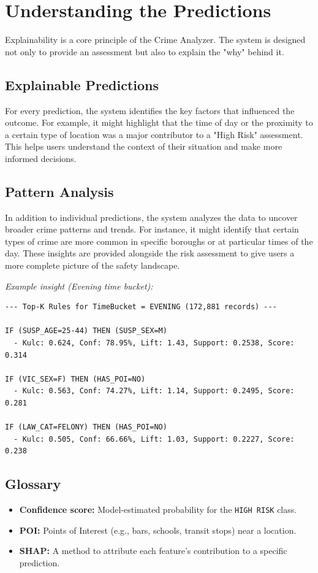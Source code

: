 \documentclass[11pt]{article}
\begin{document}
\section{Understanding the Predictions}
Explainability is a core principle of the Crime Analyzer. The system is designed not only to provide an assessment but also to explain the "why" behind it.

\subsection{Explainable Predictions}
For every prediction, the system identifies the key factors that influenced the outcome. For example, it might highlight that the time of day or the proximity to a certain type of location was a major contributor to a "High Risk" assessment. This helps users understand the context of their situation and make more informed decisions.

\subsection{Pattern Analysis}
In addition to individual predictions, the system analyzes the data to uncover broader crime patterns and trends. For instance, it might identify that certain types of crime are more common in specific boroughs or at particular times of the day. These insights are provided alongside the risk assessment to give users a more complete picture of the safety landscape.

\vspace{0.5em}
\noindent\textit{Example insight (Evening time bucket):}
\begin{verbatim}
--- Top-K Rules for TimeBucket = EVENING (172,881 records) ---

IF (SUSP_AGE=25-44) THEN (SUSP_SEX=M)
  - Kulc: 0.624, Conf: 78.95%, Lift: 1.43, Support: 0.2538, Score: 0.314

IF (VIC_SEX=F) THEN (HAS_POI=NO)
  - Kulc: 0.563, Conf: 74.27%, Lift: 1.14, Support: 0.2495, Score: 0.281

IF (LAW_CAT=FELONY) THEN (HAS_POI=NO)
  - Kulc: 0.505, Conf: 66.66%, Lift: 1.03, Support: 0.2227, Score: 0.238
\end{verbatim}

\subsection{Glossary}
\begin{itemize}[leftmargin=*]
  \item \textbf{Confidence score:} Model-estimated probability for the \texttt{HIGH RISK} class.
  \item \textbf{POI:} Points of Interest (e.g., bars, schools, transit stops) near a location.
  \item \textbf{SHAP:} A method to attribute each feature's contribution to a specific prediction.
\end{itemize}
\end{document}
